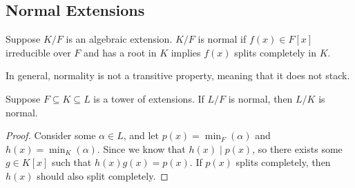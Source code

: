 \subsection*{Normal Extensions}

\begin{definition}
    Suppose \(K/F\) is an algebraic extension.
    \(K/F\) is normal if \(f(x) \in F[x]\) irreducible over \(F\)
    and has a root in \(K\) implies \(f(x)\) splits completely in \(K\).
\end{definition}
\begin{remark}
    In general, normality is not a transitive property,
    meaning that it does not stack.
\end{remark}

\begin{theorem}\label{thm:normal-upper}
    Suppose \(F \subseteq K \subseteq L\) is a tower of extensions.
    If \(L/F\) is normal, then \(L/K\) is normal.
\end{theorem}
\begin{proof}
    Consider some \(\alpha \in L\), and let \(p(x) = \min_F(\alpha)\) and \(h(x) = \min_K(\alpha)\).
    Since we know that \(h(x) \mid p(x)\),
    so there exists some \(g \in K[x]\) such that \(h(x)g(x) = p(x)\).
    If \(p(x)\) splits completely, then \(h(x)\) should also split completely.
\end{proof}

